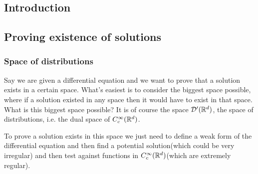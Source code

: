 \documentclass[../main.tex]{subfiles}
\begin{document}
\subsection{Introduction}
\subsection{Proving existence of solutions}
\subsubsection{Space of distributions}
Say we are given a differential equation and we want to prove that a solution exists in a certain space.
What's easiest is to consider the biggest space possible, where if a solution existed in any space then it would have to exist in that space.
What is this biggest space possible?
It is of course the space $\mathcal D'(\mathbb{R}^d)$, the space of distributions, i.e. the dual space of $C_c^\infty(\mathbb{R}^d)$.

To prove a solution exists in this space we just need to define a weak form of the differential equation and then find a potential solution(which could be very irregular) and then test against functions in $C_c^\infty(\mathbb{R}^d)$(which are extremely regular).
\end{document}
